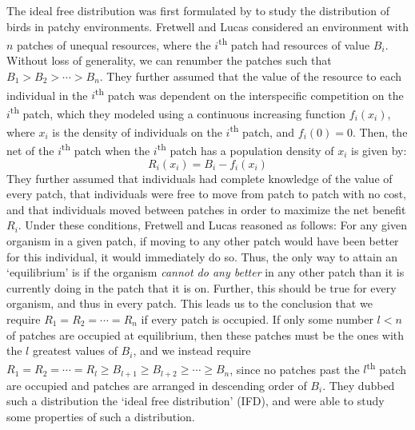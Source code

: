 The ideal free distribution was first formulated by \citet{fretwell_territorial_1969} to study the distribution of birds in patchy environments. Fretwell and Lucas considered an environment with $n$ patches of unequal resources, where the $i$\textsuperscript{th} patch had resources of value $B_i$. Without loss of generality, we can renumber the patches such that $B_1 > B_2 > \cdots > B_n$. They further assumed that the value of the resource to each individual in the $i$\textsuperscript{th} patch was dependent on the interspecific competition on the $i$\textsuperscript{th} patch, which they modeled using a continuous increasing function $f_i(x_i)$, where $x_i$ is the density of individuals on the $i$\textsuperscript{th} patch, and $f_i(0) = 0$. Then, the net of the $i$\textsuperscript{th} patch when the $i$\textsuperscript{th} patch has a population density of $x_i$ is given by:
\begin{equation}
	\label{original_IFD}
	R_i(x_i) = B_i - f_i(x_i)
\end{equation}
They further assumed that individuals had complete knowledge of the value of every patch, that individuals were free to move from patch to patch with no cost, and that individuals moved between patches in order to maximize the net benefit $R_i$. Under these conditions, Fretwell and Lucas reasoned as follows: For any given organism in a given patch, if moving to any other patch would have been better for this individual, it would immediately do so. Thus, the only way to attain an `equilibrium' is if the organism \textit{cannot do any better} in any other patch than it is currently doing in the patch that it is on. Further, this should be true for every organism, and thus in every patch. This leads us to the conclusion that we require $R_1 = R_2 = \cdots = R_n$ if every patch is occupied. If only some number $l < n$ of patches are occupied at equilibrium, then these patches must be the ones with the $l$ greatest values of $B_i$, and we instead require $R_1 = R_2 = \cdots = R_l \geq B_{l+1} \geq B_{l+2} \geq \cdots \geq B_n$, since no patches past the $l$\textsuperscript{th} patch are occupied and patches are arranged in descending order of $B_i$. They dubbed such a distribution the `ideal free distribution' (IFD), and were able to study some properties of such a distribution.

